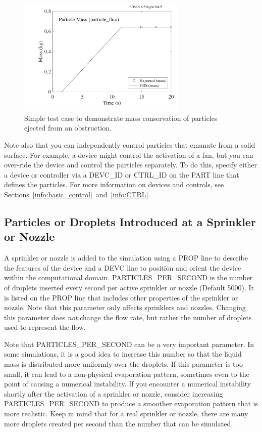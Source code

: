 \documentclass[11pt]{book}
\begin{document}
\begin{figure}[ht]
\begin{center}
\includegraphics[height=2.2in]{SCRIPT_FIGURES/particle_flux}
\end{center}
\caption[Results of the {\ct particle\_flux} test case]{Simple test case to demonstrate mass conservation of particles ejected from an obstruction.}
\label{particle_flux}
\end{figure}

Note also that you can independently control particles that emanate from a solid surface. For example, a device might control the
activation of a fan, but you can over-ride the device and control the particles separately. To do this, specify either
a device or controller via a {\ct DEVC\_ID} or {\ct CTRL\_ID} on the {\ct PART} line that defines the particles. For more
information on devices and controls, see Sections~\ref{info:basic_control}~and~\ref{info:CTRL}.



\subsection{Particles or Droplets Introduced at a Sprinkler or Nozzle}
\label{info:sprinkler_droplets}

A sprinkler or nozzle is added to the simulation using a {\ct PROP} line to describe the features of the device and a {\ct DEVC} line to position and orient the
device within the computational domain.
{\ct PARTICLES\_PER\_SECOND} is the  number of droplets inserted every
second per active sprinkler or nozzle (Default 5000). It is listed on the {\ct PROP} line that includes other properties of
the sprinkler or nozzle. Note that this parameter only affects sprinklers and nozzles.
Changing this parameter does {\em not} change the flow rate, but rather the number
of droplets used to represent the flow.

Note that {\ct PARTICLES\_PER\_SECOND} can be a very important parameter. In some simulations, it is a good idea to increase this number so that the
liquid mass is distributed more uniformly over the droplets. If this parameter is too small, it can lead to a non-physical evaporation pattern, sometimes even to the
point of causing a numerical instability. If you encounter a numerical instability shortly after the activation of a sprinkler or nozzle, consider increasing
{\ct PARTICLES\_PER\_SECOND} to produce a smoother evaporation pattern that is more realistic. Keep in mind that for a real sprinkler or nozzle, there are many more
droplets created per second than the number that can be simulated.
\end{document}
